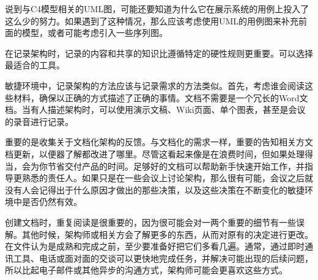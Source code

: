 说到与C4模型相关的UML图，可能还要知道为什么它在展示系统的用例上投入了这么少的努力。如果遇到了这种情况，那么应该考虑使用UML的用例图来补充前面的模型，或者可能考虑引入一些序列图。

在记录架构时，记录的内容和共享的知识比遵循特定的硬性规则更重要。可以选择最适合的工具。


敏捷环境中，记录架构的方法应该与记录需求的方法类似。首先，考虑谁会阅读这些材料，确保以正确的方式描述了正确的事情。文档不需要是一个冗长的Word文档。当有人描述架构时，可以使用演示文稿、Wiki页面、单个图表，甚至是会议的录音进行记录。

重要的是收集关于文档化架构的反馈。与文档化的需求一样，重要的告知相关方文档更新，以便器了解都改进了哪里。尽管这看起来像是在浪费时间，但如果处理得当，会为你节省交付产品的时间。足够好的文档可以帮助新手快速开始工作，并指导更熟悉的责任人。如果只是在一些会议上讨论架构，那么很有可能，会议之后就没有人会记得出于什么原因才做出的那些决策，以及这些决策在不断变化的敏捷环境中是否仍然有效。

创建文档时，重复阅读是很重要的，因为很可能会对一两个重要的细节有一些误解。其他时候，架构师或相关方会了解更多的东西，从而对原有的决定进行更改。在文件认为是成熟和完成之前，至少要准备好把它们多看几遍。通常，通过即时通讯工具、电话或面对面的交谈可以更快地完成任务，并解决可能出现的后续问题，所以比起电子邮件或其他异步的沟通方式，架构师可能会更喜欢这些方式。


























